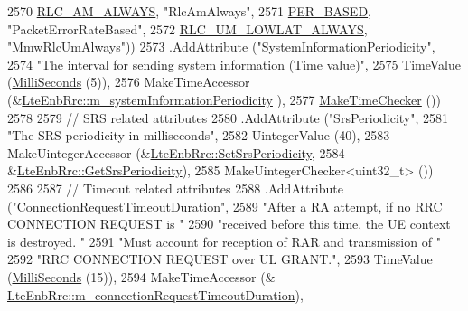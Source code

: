 \begin{DoxyCode}
2570                                     \hyperlink{classns3_1_1LteEnbRrc_a1c748bf2d69860b866dfda2a38427842a3cdf85c3ca2f87b1775fde37d95d0ace}{RLC\_AM\_ALWAYS}, \textcolor{stringliteral}{"RlcAmAlways"},
2571                                     \hyperlink{classns3_1_1LteEnbRrc_a1c748bf2d69860b866dfda2a38427842ab60559f90df74ae5b1e2ba5d7dad3c90}{PER\_BASED},     \textcolor{stringliteral}{"PacketErrorRateBased"},
2572                                     \hyperlink{classns3_1_1LteEnbRrc_a1c748bf2d69860b866dfda2a38427842a57f0cbeb7cbaf285166a276e0572c8f4}{RLC\_UM\_LOWLAT\_ALWAYS}, \textcolor{stringliteral}{"MmwRlcUmAlways"}))
2573     .AddAttribute (\textcolor{stringliteral}{"SystemInformationPeriodicity"},
2574                    \textcolor{stringliteral}{"The interval for sending system information (Time value)"},
2575                    TimeValue (\hyperlink{group__timecivil_gaf26127cf4571146b83a92ee18679c7a9}{MilliSeconds} (5)),
2576                    MakeTimeAccessor (&\hyperlink{classns3_1_1LteEnbRrc_a9f7be69996d0a982b8ae5129c0c3b1af}{LteEnbRrc::m\_systemInformationPeriodicity}
      ),
2577                    \hyperlink{group__time_ga7032965bd4afa578691d88c09e4481c1}{MakeTimeChecker} ())
2578 
2579     \textcolor{comment}{// SRS related attributes}
2580     .AddAttribute (\textcolor{stringliteral}{"SrsPeriodicity"},
2581                    \textcolor{stringliteral}{"The SRS periodicity in milliseconds"},
2582                    UintegerValue (40),
2583                    MakeUintegerAccessor (&\hyperlink{classns3_1_1LteEnbRrc_a13441a98e6d9b590a777735d6fb7909d}{LteEnbRrc::SetSrsPeriodicity}, 
2584                                          &\hyperlink{classns3_1_1LteEnbRrc_a6e253c788b5406e81fc163da669e9445}{LteEnbRrc::GetSrsPeriodicity}),
2585                    MakeUintegerChecker<uint32\_t> ())
2586 
2587     \textcolor{comment}{// Timeout related attributes}
2588     .AddAttribute (\textcolor{stringliteral}{"ConnectionRequestTimeoutDuration"},
2589                    \textcolor{stringliteral}{"After a RA attempt, if no RRC CONNECTION REQUEST is "}
2590                    \textcolor{stringliteral}{"received before this time, the UE context is destroyed. "}
2591                    \textcolor{stringliteral}{"Must account for reception of RAR and transmission of "}
2592                    \textcolor{stringliteral}{"RRC CONNECTION REQUEST over UL GRANT."},
2593                    TimeValue (\hyperlink{group__timecivil_gaf26127cf4571146b83a92ee18679c7a9}{MilliSeconds} (15)),
2594                    MakeTimeAccessor (&
      \hyperlink{classns3_1_1LteEnbRrc_a3dba971d1d2ba0891779c9860b60345b}{LteEnbRrc::m\_connectionRequestTimeoutDuration}),

\end{DoxyCode}

